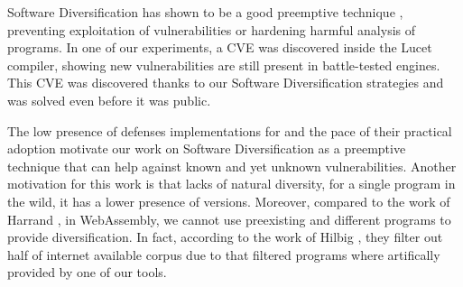 Software Diversification has shown to be a good preemptive technique \citationneeded, preventing exploitation of vulnerabilities or hardening harmful analysis of programs. In one of our experiments, a CVE was discovered inside the Lucet compiler, showing new vulnerabilities are still present in battle-tested engines. This CVE was discovered thanks to our Software Diversification strategies and was solved even before it was public. 






The low presence of defenses implementations for \wasm and the pace of their practical adoption motivate our work on Software Diversification as a preemptive technique that can help against known and yet unknown vulnerabilities.
Another motivation for this work is that \wasm lacks of natural diversity, \ie for a single \wasm program in the wild, it has a lower presence of versions. Moreover, compared to the work of Harrand \etal \cite{Harrand1650630}, in WebAssembly, we cannot use preexisting and different programs to provide diversification. In fact, according to the work of Hilbig \etal \cite{Hilbig2021AnES}, they filter out half of internet available \wasm corpus due to that filtered programs where artifically provided by one of our tools. 







